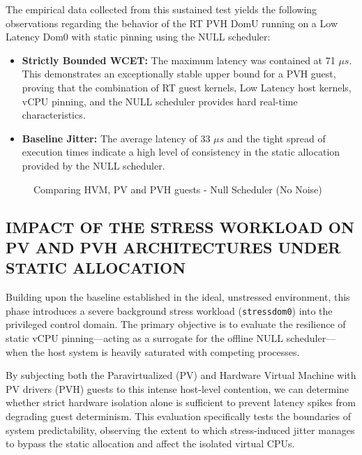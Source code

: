 The empirical data collected from this sustained test yields the
following observations regarding the behavior of the RT PVH DomU running
on a Low Latency Dom0 with static pinning using the NULL scheduler:

\begin{itemize}
\item
  \textbf{Strictly Bounded WCET:} The maximum latency was contained at
  71 $\mu s$. This demonstrates an exceptionally stable upper bound for a PVH
  guest, proving that the combination of RT guest kernels, Low Latency
  host kernels, vCPU pinning, and the NULL scheduler provides hard
  real-time characteristics.
\item
  \textbf{Baseline Jitter:} The average latency of 33 $\mu s$ and the tight
  spread of execution times indicate a high level of consistency in the
  static allocation provided by the NULL scheduler.
\end{itemize}

\begin{figure}
\centering

\caption{Comparing HVM, PV and PVH guests - Null Scheduler (No Noise)}
\end{figure}

\subsection{IMPACT OF THE STRESS WORKLOAD ON PV AND PVH ARCHITECTURES
UNDER STATIC
ALLOCATION}\label{impact-of-the-stress-workload-on-pv-and-pvh-architectures-under-static-allocation}

Building upon the baseline established in the ideal, unstressed
environment, this phase introduces a severe background stress workload
(\texttt{stressdom0}) into the privileged control domain. The primary
objective is to evaluate the resilience of static vCPU pinning---acting
as a surrogate for the offline NULL scheduler---when the host system is
heavily saturated with competing processes.

By subjecting both the Paravirtualized (PV) and Hardware Virtual Machine
with PV drivers (PVH) guests to this intense host-level contention, we
can determine whether strict hardware isolation alone is sufficient to
prevent latency spikes from degrading guest determinism. This evaluation
specifically tests the boundaries of system predictability, observing
the extent to which stress-induced jitter manages to bypass the static
allocation and affect the isolated virtual CPUs.

